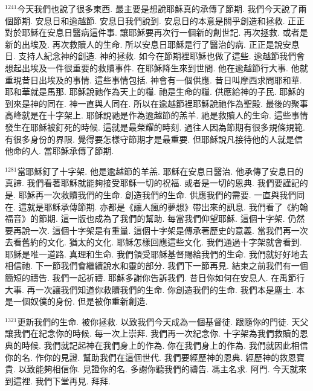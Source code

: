 \documentclass{book}
\begin{document}
$^{1241}$今天我們也說了很多東西.
最主要是想說耶穌真的承傳了節期.
我們今天說了兩個節期.
安息日和逾越節.
安息日我們說到.
安息日的本意是關乎創造和拯救.
正正對於耶穌在安息日醫病這件事.
讓耶穌要再次行一個新的創世記.
再次拯救.
或者是新的出埃及.
再次救贖人的生命.
所以安息日耶穌是行了醫治的病.
正正是說安息日.
支持人紀念神的創造.
神的拯救.
如今在節期裡耶穌也做了這些.
逾越節我們會想起出埃及一件很重要的救贖事件.
在耶穌降生來到世間.
他在逾越節行大事.
他就重現昔日出埃及的事情.
這些事情包括.
神會有一個供應.
昔日叫摩西求問耶和華.
耶和華就是馬那.
耶穌說祂作為天上的糧.
祂是生命的糧.
供應給神的子民.
耶穌的到來是神的同在.
神一直與人同在.
所以在逾越節裡耶穌說祂作為聖殿.
最後的聚事高峰就是在十字架上.
耶穌說祂是作為逾越節的羔羊.
祂是救贖人的生命.
這些事情發生在耶穌被釘死的時候.
這就是最榮耀的時刻.
過往人因為節期有很多規條規範.
有很多身份的界限.
覺得要怎樣守節期才是最重要.
但耶穌說凡接待他的人就是信他命的人.
當耶穌承傳了節期.

$^{1281}$當耶穌釘了十字架.
他是逾越節的羊羔.
耶穌在安息日醫治.
他承傳了安息日的真諦.
我們看著耶穌就能夠接受耶穌一切的祝福.
或者是一切的恩典.
我們要謹記的是.
耶穌再一次救贖我們的生命.
創造我們的生命.
供應我們的需要.
一直與我們同在.
這就是耶穌承傳節期.
亦都是《讓人瘋的夢想》帶出來的訊息.
我們看了《約翰福音》的節期.
這一版也成為了我們的幫助.
每當我們仰望耶穌.
這個十字架.
仍然要再說一次.
這個十字架是有重量.
這個十字架是傳承著歷史的意義.
當我們再一次去看舊約的文化.
猶太的文化.
耶穌怎樣回應這些文化.
我們通過十字架就會看到.
耶穌是唯一道路.
真理和生命.
我們領受耶穌基督賜給我們的生命.
我們就好好地去相信祂.
下一節我們會繼續說水和靈的部分.
我們下一節再見.
結束之前我們有一個簡短的禱告.
我們一起祈禱.
耶穌多謝你告訴我們.
昔日你如何在安息人.
在禹節行大事.
再一次讓我們知道你救贖我們的生命.
你創造我們的生命.
我們本是塵土.
本是一個奴僕的身份.
但是被你重新創造.

$^{1321}$更新我們的生命.
被你拯救.
以致我們今天成為一個基督徒.
跟隨你的門徒.
天父讓我們在紀念你的時候.
每一次上崇拜.
我們再一次紀念你.
十字架為我們救贖的恩典的時候.
我們就記起神在我們身上的作為.
你在我們身上的作為.
我們就因此相信你的名.
作你的見證.
幫助我們在這個世代.
我們要經歷神的恩典.
經歷神的救恩寶貴.
以致能夠相信你.
見證你的名.
多謝你聽我們的禱告.
馮主名求.
阿門.
今天就來到這裡.
我們下堂再見.
拜拜.
\newpage
\end{document}
